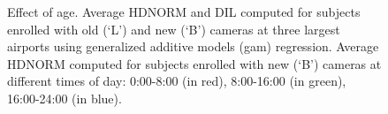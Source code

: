 \documentclass{cta-author}%
\begin{document}
\begin{figure} [!t]
	
\caption{
Effect of age. 
 { Average HDNORM and DIL computed 
for subjects enrolled with old (`L') and new (`B') cameras at three largest airports
using generalized additive models (gam) regression. 
}
 {  Average HDNORM  computed for subjects enrolled with new (`B') cameras at different times of day: 0:00-8:00 (in red), 8:00-16:00 (in green), 16:00-24:00 (in blue). 
}
\label{fAGEvsTime}}
\end{figure}
\end{document}
